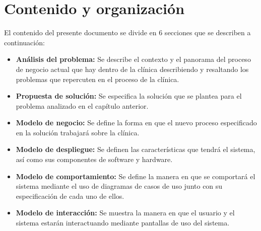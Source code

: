 \section{Contenido y organización}
El contenido del presente documento se divide en 6 secciones que se describen a continuación:

\begin{itemize}
\item \textbf{Análisis del problema: }Se describe el contexto y el panorama del proceso de negocio actual que hay dentro de la clínica describiendo y resaltando los problemas que repercuten en el proceso de la clínica.
\item \textbf{Propuesta de solución: }Se especifica la solución que se plantea para el problema analizado en el capítulo anterior. 
\item \textbf{Modelo de negocio: }Se define la forma en que el nuevo proceso especificado en la solución trabajará sobre la clínica.
\item \textbf{Modelo de despliegue: }Se definen las características que tendrá el sistema, así como sus componentes de software y hardware.
\item \textbf{Modelo de comportamiento: }Se define la manera en que se comportará el sistema mediante el uso de diagramas de casos de uso junto con su especificación de cada uno de ellos.
\item \textbf{Modelo de interacción: }Se muestra la manera en que el usuario y el sistema estarán interactuando mediante pantallas de uso del sistema.
\end{itemize}